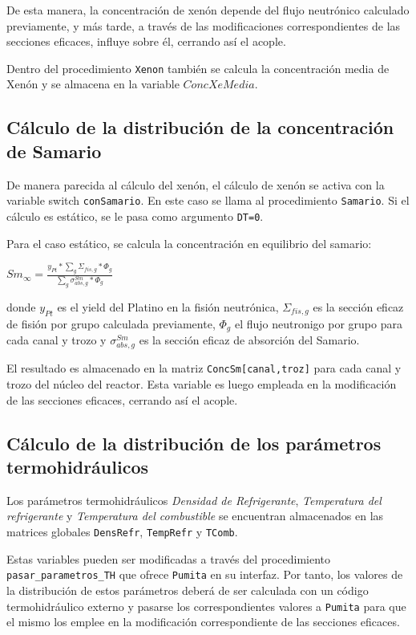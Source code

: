 De esta manera, la concentración de xenón depende del flujo neutrónico calculado previamente, y más tarde, a través de las modificaciones correspondientes de las secciones eficaces, influye sobre él, cerrando así el acople.

Dentro del procedimiento \texttt{Xenon} también se calcula la concentración media de Xenón y se almacena en la variable $ConcXeMedia$.

\subsection{Cálculo de la distribución de la concentración de Samario}

De manera parecida al cálculo del xenón, el cálculo de xenón se activa con la variable switch \texttt{conSamario}. En este caso se llama al procedimiento \texttt{Samario}. Si el cálculo es estático, se le pasa como argumento \texttt{DT=0}.

Para el caso estático, se calcula la concentración en equilibrio del samario:

${Sm}_\infty = \frac{y_{Pt} *\sum_g \Sigma_{fis,g}*\Phi_g }{\sum_g\sigma^{Sm}_{abs,g}*\Phi_g }$

donde $y_{Pt}$ es el yield del Platino en la fisión neutrónica, $\Sigma_{fis,g}$ es la sección eficaz de fisión por grupo calculada previamente, $\Phi_g$ el flujo neutronigo por grupo para cada canal y trozo y $\sigma^{Sm}_{abs,g}$ es la sección eficaz de absorción del Samario.

El resultado es almacenado en la matriz \texttt{ConcSm[canal,troz]} para cada canal y trozo del núcleo del reactor. Esta variable es luego empleada en la modificación de las secciones eficaces, cerrando así el acople.

\subsection{Cálculo de la distribución de los parámetros termohidráulicos}

Los parámetros termohidráulicos \emph{Densidad de Refrigerante}, \emph{Temperatura del refrigerante} y \emph{Temperatura del combustible} se encuentran almacenados en las matrices globales \texttt{DensRefr}, \texttt{TempRefr} y \texttt{TComb}. 

Estas variables pueden ser modificadas a través del procedimiento \texttt{pasar\_parametros\_TH} que ofrece \texttt{Pumita} en su interfaz. Por tanto, los valores de la distribución de estos parámetros deberá de ser calculada con un código termohidráulico externo y pasarse los correspondientes valores a \texttt{Pumita} para que el mismo los emplee en la modificación correspondiente de las secciones eficaces. 

